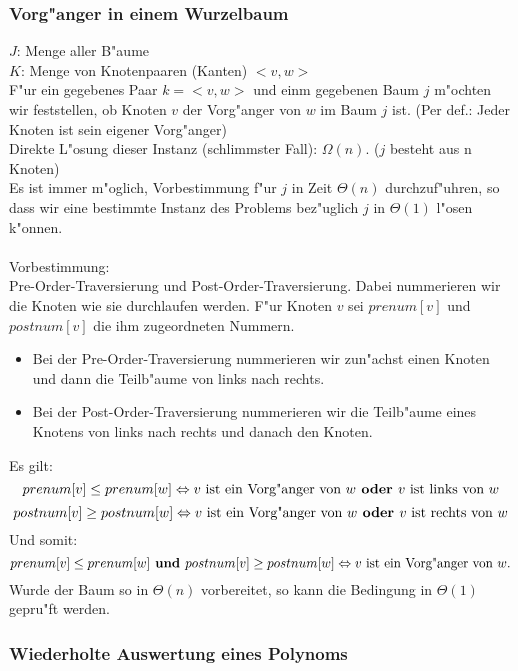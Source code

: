 \documentclass[a4paper]{scrartcl}
\begin{document}
\subsubsection*{Vorg"anger in einem Wurzelbaum}	

$J$: Menge aller B"aume\\
$K$: Menge von Knotenpaaren (Kanten) $<v,w>$\\

F"ur ein gegebenes Paar $k=<v,w>$ und einm gegebenen Baum $j$ m"ochten wir feststellen, ob Knoten $v$ der Vorg"anger von $w$ im Baum $j$ ist. (Per def.: Jeder Knoten ist sein eigener Vorg"anger)\\
Direkte L"osung dieser Instanz (schlimmster Fall): $\Omega(n)$. ($j$ besteht aus n Knoten)\\ 

Es ist immer m"oglich, Vorbestimmung f"ur $j$ in Zeit $\Theta(n)$ durchzuf"uhren, so dass wir eine bestimmte Instanz des Problems bez"uglich $j$ in $\Theta(1)$ l"osen k"onnen.\\

\\

Vorbestimmung: \\
 Pre-Order-Traversierung und Post-Order-Traversierung. Dabei nummerieren wir die Knoten wie sie durchlaufen werden. F"ur Knoten $v$ sei $prenum[v]$ und $postnum[v]$ die ihm zugeordneten Nummern. 
\begin{itemize}
	\item Bei der Pre-Order-Traversierung nummerieren wir zun"achst einen Knoten und dann die Teilb"aume von links nach rechts. 
	\item Bei der Post-Order-Traversierung nummerieren wir die Teilb"aume eines Knotens von links nach rechts und danach den Knoten.
\end{itemize}
 Es gilt: 
 $$prenum[v]\le prenum[w] \Leftrightarrow v \text{ ist ein Vorg"anger von } w \textbf{ oder } v \text{ ist links von } w$$
 $$postnum[v]\ge postnum[w] \Leftrightarrow v \text{ ist ein Vorg"anger von } w \textbf{ oder } v \text{ ist rechts von } w$$
 Und somit:
 $$prenum[v]\le prenum[w] \textbf{ und } postnum[v]\ge postnum[w] \Leftrightarrow v \text{ ist ein Vorg"anger von } w.$$
 Wurde der Baum so in $\Theta(n)$ vorbereitet, so kann die Bedingung in $\Theta(1)$ gepru"ft  werden.
 
\subsubsection*{Wiederholte Auswertung eines Polynoms}
\end{document}
